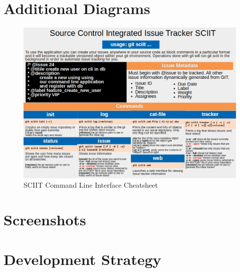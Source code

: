 \documentclass{mproj}
\begin{document}
\chapter{Additional Diagrams}
\begin{figure}[h!]
\caption{SCIIT Command Line Interface Cheatsheet}
\label{fig:sciit-cheatsheet}
\centering
\includegraphics[width=16cm]{Cheatsheet}
\end{figure}


\chapter{Screenshots}





\chapter{Development Strategy}





\end{document}
